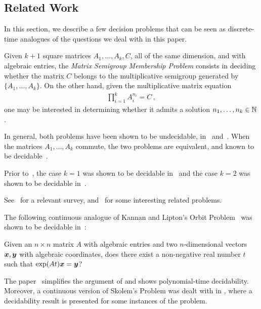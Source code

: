 \subsection{Related Work}
\label{sec:lics_related_work}

In this section, we describe a few decision problems that can be seen as discrete-time analogues of the questions we deal with in this paper.

Given $k+1$ square matrices $A_{1}, \ldots, A_{k}, C$, all of the same dimension, and with algebraic entries, the \emph{Matrix Semigroup Membership Problem} consists in deciding whether the matrix $C$ belongs to the multiplicative semigroup generated by $\lbrace A_{1}, \ldots, A_{k} \rbrace$.
On the other hand, given the multiplicative matrix equation
\begin{align*}
\prod\limits_{i=1}^{k} A_{i}^{n_{i}} = C \, ,
\end{align*}
one may be interested in determining whether it admits a solution $n_{1}, \ldots, n_{k} \in \mathbb{N}$.

In general, both problems have been shown to be undecidable, in~\cite{Paterson} and~\cite{MEHTP}.
When the matrices $A_{1}, \ldots, A_{k}$ commute, the two problems are
equivalent, and known to be decidable~\cite{MultiplicativeMatrixEquations}.

Prior to~\cite{MultiplicativeMatrixEquations}, the case $k=1$ was shown to be decidable in~\cite{KL86} and the case $k=2$ was shown to be decidable in~\cite{ABC}.

See~\cite{HalavaSurvey} for a relevant survey, and~\cite{CK05} for
some interesting related problems.

The following continuous analogue of Kannan and Lipton's Orbit
Problem~\cite{KL86} was shown to be decidable in~\cite{Hainry08}:

\begin{definition}
Given an $n \times n$ matrix $A$ with algebraic entries and two
$n$-dimensional vectors $\boldsymbol{x}, \boldsymbol{y}$ with
algebraic coordinates, does there exist a non-negative real number $t$ such
that $\exp(At) \boldsymbol{x} = \boldsymbol{y}$?
\end{definition}

The paper~\cite{ContinuousOrbitIPL} simplifies the argument of
\cite{Hainry08} and shows polynomial-time decidability. Moreover, a
continuous version of Skolem's Problem was dealt with in
\cite{ContinuousSkolem}, where a decidability result is presented for
some instances of the problem.

